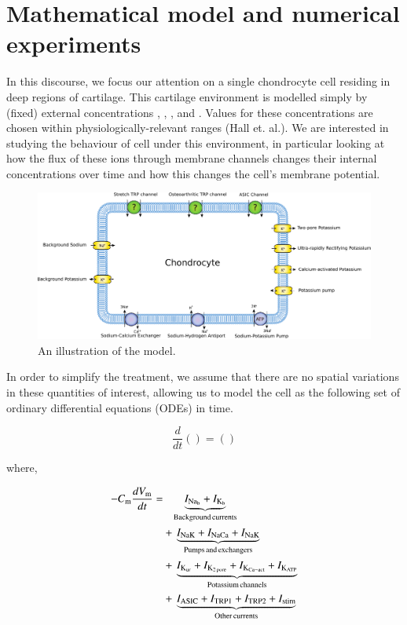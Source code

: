 \section{Mathematical model and numerical experiments}
\label{model}

In this discourse, we focus our attention on a single chondrocyte cell
residing in deep regions of cartilage. This cartilage environment is
modelled simply by (fixed) external concentrations \Nao, \Ko, \Cao,
and \Ho. Values for these concentrations are chosen within
physiologically-relevant ranges (Hall et. al.). We are interested in
studying the behaviour of cell under this environment, in particular
looking at how the flux of these ions through membrane channels
changes their internal concentrations over time and how this changes
the cell's membrane potential.

\begin{figure}
  \centering
  \includegraphics[width=\textwidth]{../images/pdf/chondrocyte-model-cellml}
  \caption{An illustration of the model.}
  \label{fig:chondrocyte-model}
\end{figure}

In order to simplify the treatment, we assume that there are no
spatial variations in these quantities of interest, allowing us to
model the cell as the following set of ordinary differential equations
(ODEs) in time.

\begin{equation}
\frac{d}{dt} () = ()
\end{equation}

\noindent where,

\begin{displaymath}
    \begin{split}
      -C_{\rm m} \frac{dV_{\rm m}}{dt} =
      & \phantom{+\,} \underbrace{I_{\rm Na_b} + I_{\rm K_b}}_{\rm Background\, currents}\\
      & +\, \underbrace{I_{\rm NaK} + I_{\rm NaCa} + I_{\rm NaK}}_{\rm Pumps\, and\, exchangers}\\
      & +\, \underbrace{I_{\rm K_{ur}} + I_{\rm K_{2\, pore}} + I_{\rm K_{Ca-act}} + I_{\rm K_{ATP}}}_{\rm Potassium\, channels}\\
      & +\, \underbrace{I_{\rm ASIC} + I_{\rm TRP1} + I_{\rm TRP2} + I_{\rm stim}}_{\rm Other\, currents}
    \end{split}
\end{displaymath}

